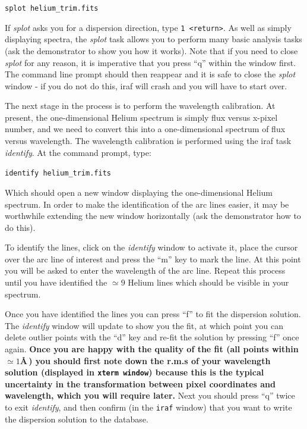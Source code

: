 \documentclass[12pt]{article}
\begin{document}
{\tt splot helium\verb,_trim,.fits}

If {\it splot} asks you for a dispersion direction, type {\tt 1
  <return>}. As well as simply displaying spectra, the {\it splot} task allows you
to perform many basic analysis tasks (ask the demonstrator to show you
how it works).  Note that if you need to close {\it splot} for any reason,
it is imperative that you press ``q'' within the window first. The command
line prompt should then reappear and it is safe to close the {\it splot} window - 
if you do not do this, {\sc iraf} will crash and you will have to start over.

The next stage in the process is to perform the wavelength
calibration. At present, the one-dimensional Helium spectrum is 
simply flux versus x-pixel number, and we need to convert this into a 
one-dimensional spectrum of flux versus wavelength. The wavelength
calibration is performed using the {\sc iraf} task {\it identify}. 
At the command prompt, type:

{\tt identify helium\verb,_trim.fits,}

Which should open a new window displaying the one-dimensional Helium
spectrum. In order to make the identification of the arc lines easier, it
may be worthwhile extending the new window horizontally (ask the
demonstrator how to do this).

To identify the lines, click on the {\it identify} window to activate
it, place the cursor over the arc line of interest and press the ``m''
key to mark the line. At this point you will be asked to enter the
wavelength of the arc line. Repeat this process
until you have identified the $\simeq 9$ Helium lines which should be
visible in your spectrum. 

\noindent
Once you have
identified the lines you can press ``f'' to fit the dispersion
solution. The {\it identify} window will update to show you the fit,
at which point you can delete outlier points with the ``d'' key and
re-fit the solution by pressing ``f'' once again. {\bf Once you are happy
with the quality of the fit (all points within $\simeq1$\AA\,) you
should first note down the r.m.s of your wavelength solution (displayed in
{\tt xterm window}) because this is the typical uncertainty in the 
transformation between pixel coordinates and wavelength, which you will require later.}
Next you should press ``q'' twice to exit {\it identify}, and then
confirm (in the {\tt iraf} window) that you want to write the dispersion solution to the database. 
\end{document}

